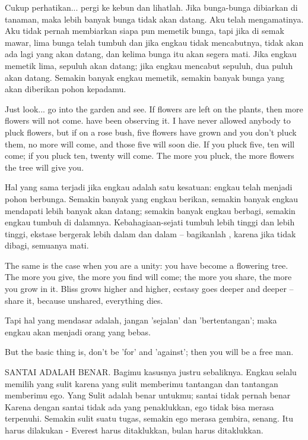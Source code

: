 \bahasa
Cukup perhatikan... pergi ke kebun dan lihatlah. Jika bunga-bunga dibiarkan di tanaman, maka lebih banyak bunga tidak akan datang. Aku telah mengamatinya. Aku tidak pernah membiarkan siapa pun memetik bunga, tapi jika di semak mawar, lima bunga telah tumbuh dan jika engkau tidak mencabutnya, tidak akan ada lagi yang akan datang, dan kelima bunga itu akan segera mati. Jika engkau memetik lima, sepuluh akan datang; jika engkau mencabut sepuluh, dua puluh akan datang. Semakin banyak engkau memetik, semakin banyak bunga yang akan diberikan pohon kepadamu.

\english
Just look... go into the garden and see. If flowers are left on the plants, then more flowers will not come. have been observing it. I have never allowed anybody to pluck flowers, but if on a rose bush, five flowers have grown and you don't pluck them, no more will come, and those five will soon die. If you pluck five, ten will come; if you pluck ten, twenty will come. The more you pluck, the more flowers the tree will give you.

\bahasa
Hal yang sama terjadi jika engkau adalah satu kesatuan: engkau telah menjadi pohon berbunga. Semakin banyak yang engkau berikan, semakin banyak engkau mendapati lebih banyak akan datang; semakin banyak engkau berbagi, semakin engkau tumbuh di dalamnya. Kebahagiaan-sejati tumbuh lebih tinggi dan lebih tinggi, ekstase bergerak lebih dalam dan dalam -- bagikanlah , karena jika tidak dibagi, semuanya mati.

\english
The same is the case when you are a unity: you have become a flowering tree. The more you give, the more you find will come; the more you share, the more you grow in it. Bliss grows higher and higher, ecstasy goes deeper and deeper -- share it, because unshared, everything dies.

\bahasa
Tapi hal yang mendasar adalah, jangan 'sejalan' dan 'bertentangan'; maka engkau akan menjadi orang yang bebas.

\english
But the basic thing is, don't be 'for' and 'against'; then you will be a free man.

\bahasa
SANTAI ADALAH BENAR. Bagimu kasusnya justru sebaliknya. Engkau selalu memilih yang sulit karena yang sulit memberimu tantangan dan tantangan memberimu ego. Yang Sulit adalah benar untukmu; santai tidak pernah benar Karena dengan santai tidak ada yang penaklukkan, ego tidak bisa merasa terpenuhi. Semakin sulit suatu tugas, semakin ego merasa gembira, senang. Itu harus dilakukan - Everest harus ditaklukkan, bulan harus ditaklukkan.

